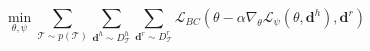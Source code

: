 \begin{equation}
 \label{eq:daml}
 \underset{\theta,\psi}{\min} \sum_{\mathcal{T} \sim p(\mathcal{T})} \sum_{\mathbf{d}^{h} \sim D^{h}_{\mathcal{T}}} \sum_{\mathbf{d}{^r} \sim D^{r}_{\mathcal{T}}} \mathcal{L}_{BC}(\theta - \alpha \nabla_\theta\mathcal{L}_{\psi}(\theta,\mathbf{d}^{h}), \mathbf{d}^{r})
\end{equation}
